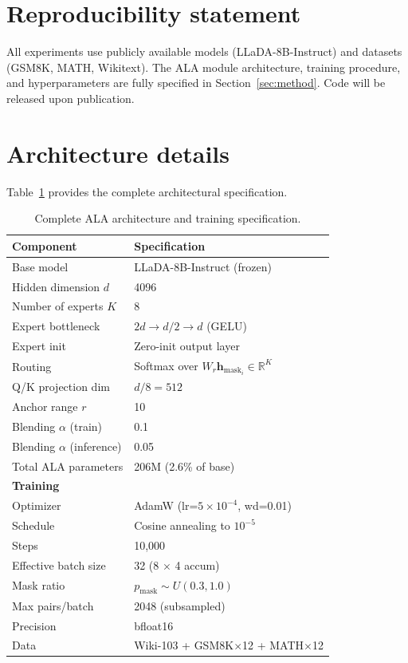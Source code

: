 \documentclass{article} %
\newcommand{\pmask}{p_{\text{mask}}}
\newcommand{\hmask}{\mathbf{h}_{\text{mask}}}
\begin{document}

\section*{Reproducibility statement}

All experiments use publicly available models (LLaDA-8B-Instruct) and datasets (GSM8K, MATH, Wikitext).
The ALA module architecture, training procedure, and hyperparameters are fully specified in Section~\ref{sec:method}.
Code will be released upon publication.





\appendix

\section{Architecture details}
\label{app:arch}

Table~\ref{tab:arch} provides the complete architectural specification.

\begin{table}[h]
\begin{center}
\begin{tabular}{ll}
\toprule
\textbf{Component} & \textbf{Specification} \\
\midrule
Base model & LLaDA-8B-Instruct (frozen) \\
Hidden dimension $d$ & 4096 \\
Number of experts $K$ & 8 \\
Expert bottleneck & $2d \to d/2 \to d$ (GELU) \\
Expert init & Zero-init output layer \\
Routing & Softmax over $W_r \hmask_i \in \mathbb{R}^K$ \\
Q/K projection dim & $d/8 = 512$ \\
Anchor range $r$ & 10 \\
Blending $\alpha$ (train) & 0.1 \\
Blending $\alpha$ (inference) & 0.05 \\
Total ALA parameters & 206M (2.6\% of base) \\
\midrule
\textbf{Training} & \\
\midrule
Optimizer & AdamW (lr=$5{\times}10^{-4}$, wd=0.01) \\
Schedule & Cosine annealing to $10^{-5}$ \\
Steps & 10,000 \\
Effective batch size & 32 (8 $\times$ 4 accum) \\
Mask ratio & $\pmask \sim U(0.3, 1.0)$ \\
Max pairs/batch & 2048 (subsampled) \\
Precision & bfloat16 \\
Data & Wiki-103 + GSM8K$\times$12 + MATH$\times$12 \\
\bottomrule
\end{tabular}
\end{center}
\caption{Complete ALA architecture and training specification.}\label{tab:arch}
\end{table}
\end{document}
